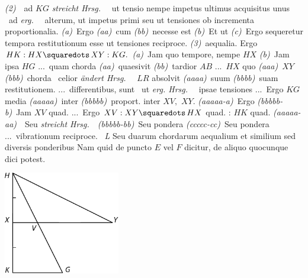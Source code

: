 {{\textit{(2)}~\textbar~ad $KG$ \textit{streicht Hrsg.}~%
\textbar\ ut tensio nempe impetus ultimus acquisitus unus
\textbar~ad \textit{erg.}~%
\textbar\ alterum, ut impetus primi seu ut tensiones ob incrementa proportionalia.
\textit{(a)}~Ergo
\textit{(aa)}~cum
\textit{(bb)}~necesse est
\textit{(b)}~Et ut
\textit{(c)}~Ergo sequeretur tempora restitutionum esse ut tensiones reciproce. 
\textit{(3)}~aequalia. Ergo $\displaystyle HK : HX \squaredots\, XY : KG.$
\textit{(a)}~Jam quo tempore, nempe $HX$
\textit{(b)}~Jam ipsa $HG$ \lbrack...\rbrack\ quam chorda
\textit{(aa)}~quaesivit
\textit{(bb)}~tardior $AB$ \lbrack...\rbrack\ $HX$ quo %
\textit{(aaa)}~$XY$
\textit{(bbb)}~chorda
\textbar~celior \textit{ändert Hrsg.}~%
\textbar\ $LR$ absolvit
\textit{(aaaa)}~suum
\textit{(bbbb)}~suam restitutionem. \lbrack...\rbrack\ differentibus, sunt
\textbar~ut \textit{erg. Hrsg.}~%
\textbar\ ipsae tensiones \lbrack...\rbrack\ Ergo $KG$ media
\textit{(aaaaa)}~inter
\textit{(bbbbb)}~proport. inter $XV,$ $XY.$
\textit{(aaaaa-a)}~Ergo
\textit{(bbbbb-b)}~Jam $XV$ quad. \lbrack...\rbrack\ Ergo $XV : XY \squaredots\, HX$ quad. : $HK$ quad.
\textit{(aaaaa-aa)}~\textbar~Seu \textit{streicht Hrsg.}~\textbar\
\textit{(bbbbb-bb)}~Seu pondera
\textit{(ccccc-cc)}~Seu pondera \lbrack...\rbrack\ vibrationum reciproce.%
~\textit{L}}}
Seu duarum chordarum aequalium et similium sed diversis ponderibus\protect{}
Nam quid de puncto $E$ vel $F$ dicitur,
de aliquo quocunque dici potest.
\pend%
\newpage%
%
%
 \centerline{\includegraphics[width=0.38\textwidth]{gesamttex/edit_VIII,3/images/LH_35_09_15_012-013_d2.pdf}}%
